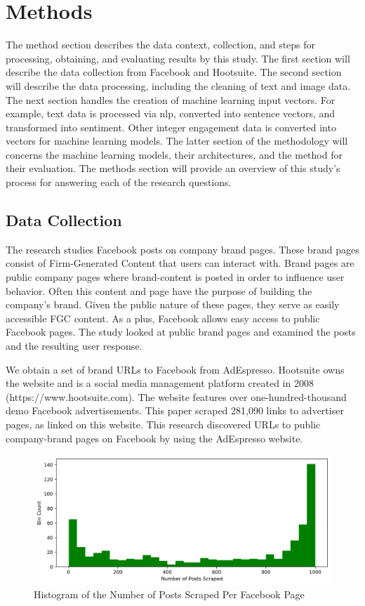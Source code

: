 \documentclass[mksc,blindrev]{informs3} %
\begin{document}
\section{Methods}
The method section describes the data context, collection, and steps for processing, obtaining, and evaluating results by this study. The first section will describe the data collection from Facebook and Hootsuite. The second section will describe the data processing, including the cleaning of text and image data. The next section handles the creation of machine learning input vectors. For example, text data is processed via nlp, converted into sentence vectors, and transformed into sentiment. Other integer engagement data is converted into vectors for machine learning models. The latter section of the methodology will concerns the machine learning models, their architectures, and the method for their evaluation. The methods section will provide an overview of this study's process for answering each of the research questions.

\subsection{Data Collection}
The research studies Facebook posts on company brand pages. These brand pages consist of Firm-Generated Content that users can interact with. Brand pages are public company pages where brand-content is posted in order to influence user behavior. Often this content and page have the purpose of building the company's brand. Given the public nature of these pages, they serve as easily accessible FGC content. As a plus, Facebook allows easy access to public Facebook pages. The study looked at public brand pages and examined the posts and the resulting user response.

We obtain a set of brand URLs to Facebook from AdEspresso. Hootsuite owns the website and is a social media management platform created in 2008 (https://www.hootsuite.com). The website features over one-hundred-thousand demo Facebook advertisements. This paper scraped 281,090 links to advertiser pages, as linked on this website. This research discovered URLs to public company-brand pages on Facebook by using the AdEspresso website.

\begin{figure}
    \includegraphics[width=\columnwidth]{images/Posts_Per_Page_Histogram.png}
    \caption{Histogram of the Number of Posts Scraped Per Facebook Page}
    \label{fig:histogram_posts_scraped}
\end{figure}
\end{document}
